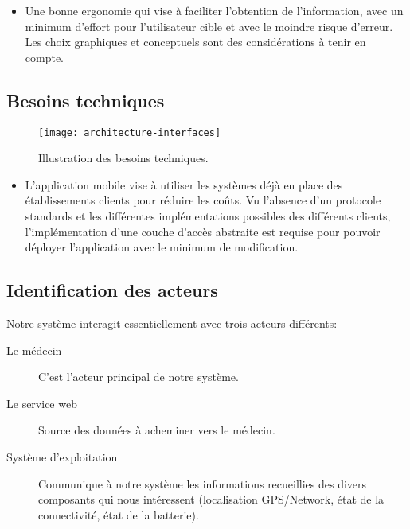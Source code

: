 \begin{itemize}

\item Une bonne ergonomie qui vise à faciliter l'obtention de
l'information, avec un minimum d'effort pour l'utilisateur cible et
avec le moindre risque d'erreur. Les choix graphiques et conceptuels
sont des considérations à tenir en compte.

\end{itemize}

\subsection{Besoins techniques}

\begin{figure}[H]
\center
\texttt{[image: architecture-interfaces]}
\caption{Illustration des besoins techniques.}
\end{figure}

\begin{itemize}

\item L’application mobile vise à utiliser les systèmes déjà en place des
établissements clients pour réduire les coûts. Vu l’absence d'un protocole
standards et les différentes implémentations possibles des différents clients,
l'implémentation d'une couche d’accès abstraite est requise pour pouvoir
déployer l’application avec le minimum de modification.

\end{itemize}

\subsection{Identification des acteurs}

Notre système interagit essentiellement avec trois acteurs différents:

\begin{description}

\item[Le médecin] C'est l'acteur principal de notre système.

\item[Le service web] Source des données à acheminer vers le médecin.

\item[Système d'exploitation] Communique à notre système les
informations recueillies des divers composants qui nous intéressent
(localisation GPS/Network, état de la connectivité, état de la
batterie).

\end{description}

